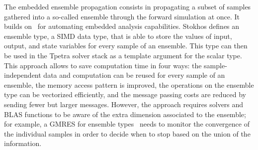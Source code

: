 The embedded ensemble propagation consists in propagating a subset of samples gathered into a so-called ensemble through the forward simulation at once.
It builds on~\cite{pawlowski2012automating} for automating embedded analysis capabilities. Stokhos defines an ensemble type, a SIMD data type, that is able to store
the values of input, output, and state variables for every sample of an ensemble. This type can then be used in the Tpetra solver stack as a template argument for the scalar type.
This approach allows to save computation time in four ways: the sample-independent data and computation can be reused for every sample of an ensemble, the memory access pattern is improved,
the operations on the ensemble type can be vectorized efficiently, and the message passing costs are reduced by sending fewer but larger messages.
However, the approach requires solvers and BLAS functions to be aware of the extra dimension associated to the ensemble; for example, a GMRES for ensemble types~\cite{liegeois2020gmres} needs to monitor 
the convergence of the individual samples in order to decide when to stop based on the union of the information.

